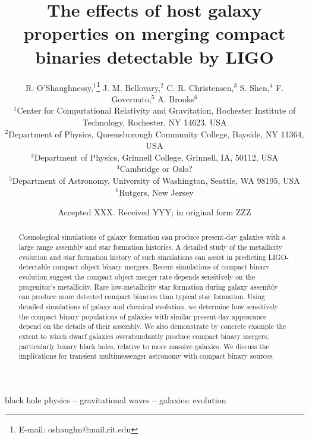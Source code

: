 \documentclass[a4paper,fleqn,usenatbib]{mnras}
\title[Effects of host galaxy properties on LIGO binaries]{The effects of host galaxy properties on merging compact binaries detectable by LIGO}
\author[R. O'Shaughnessy et al.]{R. O'Shaughnessy,$^1$\thanks{E-mail: oshaughn@mail.rit.edu}
J. M. Bellovary,$^2$ 
C. R. Christensen,$^3$ 
S. Shen,$^4$ 
F. Governato,$^5$ 
A. Brooks$^6$\\
%
%
$^1$Center for Computational Relativity and Gravitation, Rochester Institute of Technology, Rochester, NY 14623, USA  \\
$^2$Department of Physics, Queensborough Community College, Bayside, NY 11364, USA\\
$^3$Department of Physics, Grinnell College, Grinnell, IA, 50112, USA\\
$^4$Cambridge or Oslo?\\
$^5$Department of Astronomy, University of Washington, Seattle, WA 98195, USA\\
$^6$Rutgers, New Jersey
 }
\date{Accepted XXX. Received YYY; in original form ZZZ}
\begin{document}
\label{firstpage}
\pagerange{\pageref{firstpage}--\pageref{lastpage}}
\maketitle



\begin{abstract}
Cosmological simulations of galaxy formation can produce present-day galaxies with a large range assembly and star formation histories.  A detailed study of the metallicity evolution and star formation history of such simulations can assist in predicting LIGO-detectable compact object binary mergers.
Recent simulations of compact binary evolution suggest the compact object merger rate depends
sensitively on the progenitor's metallicity.  Rare low-metallicity star formation during galaxy
assembly can produce more detected compact binaries than typical star formation.   
Using detailed simulations of galaxy and chemical evolution, we determine how sensitively the compact binary populations
of galaxies   with similar
present-day appearance depend on the details of their assembly.
We also demonstrate by concrete example the extent to which dwarf galaxies overabundantly produce compact binary
mergers, particularly binary black holes, relative to more massive galaxies. 
We discuss the implications for transient multimessenger astronomy with compact binary sources. 


\end{abstract}


\begin{keywords}
black hole physics -- gravitational waves -- galaxies: evolution
\end{keywords}


\end{document}
